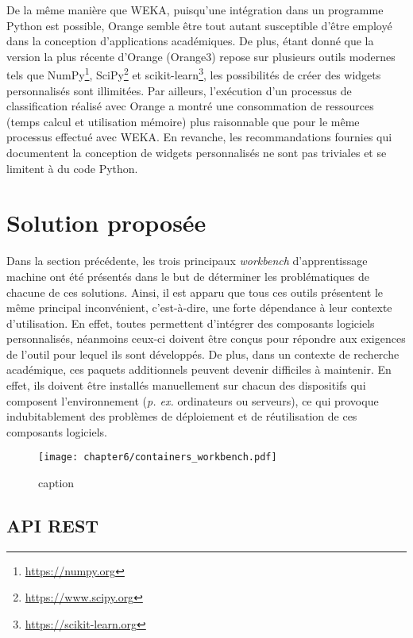 De la même manière que WEKA, puisqu'une intégration dans un programme Python est possible, Orange semble être tout autant susceptible d'être employé dans la conception d'applications académiques. De plus, étant donné que la version la plus récente d'Orange (Orange3) repose sur plusieurs outils modernes tels que NumPy\footnote{\url{https://numpy.org}}, SciPy\footnote{\url{https://www.scipy.org}} et scikit-learn\footnote{\url{https://scikit-learn.org}}, les possibilités de créer des widgets personnalisés sont illimitées. Par ailleurs, l'exécution d'un processus de classification réalisé avec Orange a montré une consommation de ressources (temps calcul et utilisation mémoire) plus raisonnable que pour le même processus effectué avec \acs{WEKA}. En revanche, les recommandations fournies qui documentent la conception de widgets personnalisés ne sont pas triviales et se limitent à du code Python.

\section{Solution proposée}

Dans la section précédente, les trois principaux \textit{workbench} d'apprentissage machine ont été présentés dans le but de déterminer les problématiques de chacune de ces solutions. Ainsi, il est apparu que tous ces outils présentent le même principal inconvénient, c'est-à-dire, une forte dépendance à leur contexte d'utilisation. En effet, toutes permettent d'intégrer des composants logiciels personnalisés, néanmoins ceux-ci doivent être conçus pour répondre aux exigences de l'outil pour lequel ils sont développés. De plus, dans un contexte de recherche académique, ces paquets additionnels peuvent devenir difficiles à maintenir. En effet, ils doivent être installés manuellement sur chacun des dispositifs qui composent l'environnement (\textit{p. ex.} ordinateurs ou serveurs), ce qui provoque indubitablement des problèmes de déploiement et de réutilisation de ces composants logiciels.

\begin{figure}[H]
	\centering
	\texttt{[image: chapter6/containers\_workbench.pdf]}
        \caption{caption}
	\label{fig:containers_workbench}
\end{figure}

\subsection{API REST}

